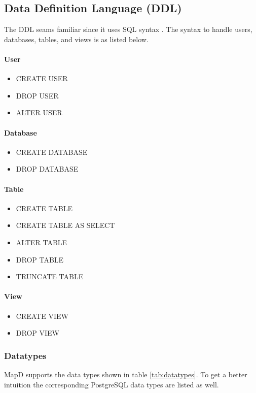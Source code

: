 \subsection{Data Definition Language (DDL)}
The DDL seams familiar since it uses SQL syntax \cite{ddl}.
The syntax to handle users, databases, tables, and views is as listed below.

\paragraph{User}
\begin{itemize}
 \item CREATE USER
 \item DROP USER
 \item ALTER USER
\end{itemize}

\paragraph{Database}
\begin{itemize}
 \item CREATE DATABASE
 \item DROP DATABASE
\end{itemize}


\paragraph{Table}
\begin{itemize}
 \item CREATE TABLE
 \item CREATE TABLE AS SELECT
 \item ALTER TABLE
 \item DROP TABLE
 \item TRUNCATE TABLE
\end{itemize}

\paragraph{View}
\begin{itemize}
 \item CREATE VIEW
 \item DROP VIEW
\end{itemize}


\subsubsection{Datatypes}
MapD supports the data types shown in table \ref{tab:datatypes}.
To get a better intuition the corresponding PostgreSQL data types are listed as well.

